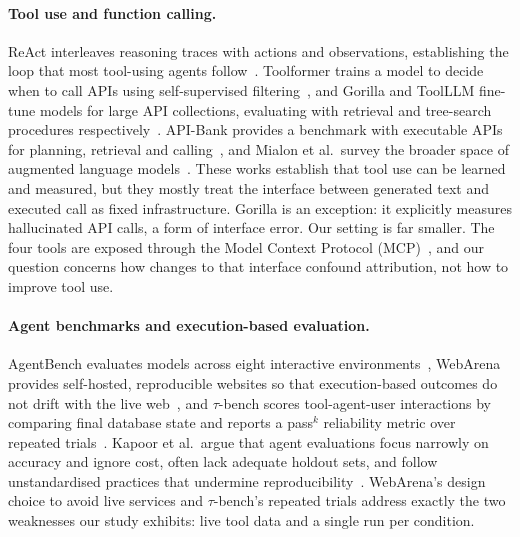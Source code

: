 \documentclass[runningheads]{llncs}
\begin{document}
\paragraph{Tool use and function calling.}
ReAct interleaves reasoning traces with actions and observations, establishing the loop that most tool-using agents follow~\cite{yao2023react}. Toolformer trains a model to decide when to call APIs using self-supervised filtering~\cite{schick2023toolformer}, and Gorilla and ToolLLM fine-tune models for large API collections, evaluating with retrieval and tree-search procedures respectively~\cite{patil2024gorilla,qin2024toolllm}. API-Bank provides a benchmark with executable APIs for planning, retrieval and calling~\cite{li2023apibank}, and Mialon et al.\ survey the broader space of augmented language models~\cite{mialon2023alm}. These works establish that tool use can be learned and measured, but they mostly treat the interface between generated text and executed call as fixed infrastructure. Gorilla is an exception: it explicitly measures hallucinated API calls, a form of interface error. Our setting is far smaller. The four tools are exposed through the Model Context Protocol (MCP)~\cite{mcp2025spec}, and our question concerns how changes to that interface confound attribution, not how to improve tool use.

\paragraph{Agent benchmarks and execution-based evaluation.}
AgentBench evaluates models across eight interactive environments~\cite{liu2024agentbench}, WebArena provides self-hosted, reproducible websites so that execution-based outcomes do not drift with the live web~\cite{zhou2024webarena}, and $\tau$-bench scores tool-agent-user interactions by comparing final database state and reports a pass$^k$ reliability metric over repeated trials~\cite{yao2024taubench}. Kapoor et al.\ argue that agent evaluations focus narrowly on accuracy and ignore cost, often lack adequate holdout sets, and follow unstandardised practices that undermine reproducibility~\cite{kapoor2025agents}. WebArena's design choice to avoid live services and $\tau$-bench's repeated trials address exactly the two weaknesses our study exhibits: live tool data and a single run per condition.
\end{document}
